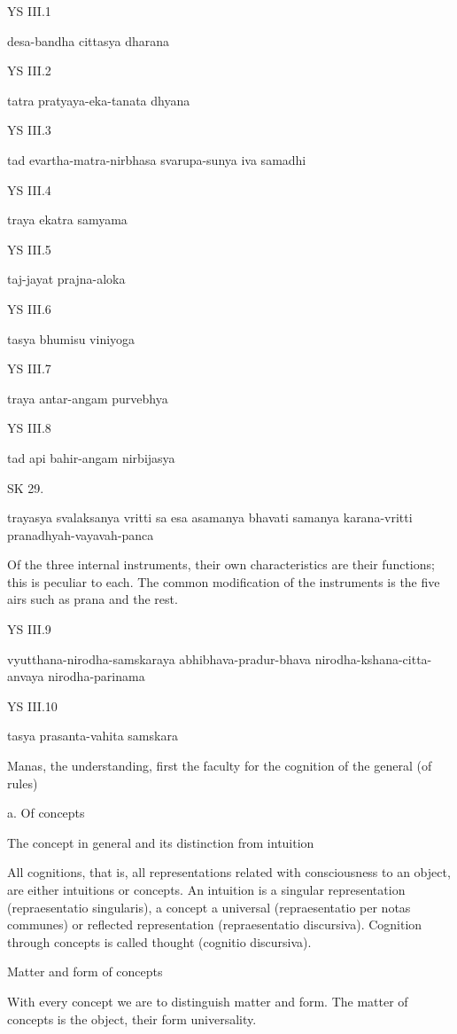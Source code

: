 YS III.1

    desa-bandha cittasya dharana

YS III.2

    tatra pratyaya-eka-tanata dhyana

YS III.3

    tad evartha-matra-nirbhasa svarupa-sunya iva samadhi

YS III.4

    traya ekatra samyama

YS III.5

    taj-jayat prajna-aloka

YS III.6

    tasya bhumisu viniyoga

YS III.7

    traya antar-angam purvebhya

YS III.8

    tad api bahir-angam nirbijasya

SK 29.

trayasya svalaksanya vritti sa esa asamanya bhavati
samanya karana-vritti pranadhyah-vayavah-panca

Of the three internal instruments,
their own characteristics are their functions;
this is peculiar to each.
The common modification of the instruments is the five airs
such as prana and the rest.

YS III.9

    vyutthana-nirodha-samskaraya abhibhava-pradur-bhava
    nirodha-kshana-citta-anvaya nirodha-parinama

YS III.10

    tasya prasanta-vahita samskara

    Manas, the understanding, first the faculty
    for the cognition of the general (of rules)

    a. Of concepts

    The concept in general and its distinction from intuition

        All cognitions, that is,
        all representations related with consciousness to an object,
        are either intuitions or concepts.
        An intuition is a singular representation (repraesentatio singularis),
        a concept a universal (repraesentatio per notas communes)
        or reflected representation (repraesentatio discursiva).
        Cognition through concepts is called thought (cognitio discursiva).

    Matter and form of concepts

        With every concept we are to distinguish matter and form.
        The matter of concepts is the object,
        their form universality.

